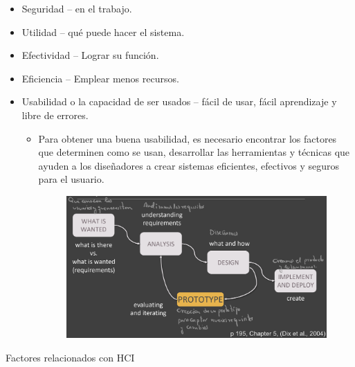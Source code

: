 \documentclass[12pt, twoside, openright]{report} %
\begin{document}
    \begin{itemize}
    
    \item
      Seguridad -- en el trabajo.
    \item
      Utilidad -- qué puede hacer el sistema.
    \item
      Efectividad -- Lograr su función.
    \item
      Eficiencia -- Emplear menos recursos.
    \item
      Usabilidad o la capacidad de ser usados -- fácil de usar, fácil
      aprendizaje y libre de errores.

      \begin{itemize}
      
      \item
        Para obtener una buena usabilidad, es necesario encontrar los
        factores que determinen como se usan, desarrollar las
        herramientas y técnicas que ayuden a los diseñadores a crear
        sistemas eficientes, efectivos y seguros para el usuario.

		\begin{figure}[H]
			{\includegraphics[scale=.17]{Untitled 3.png}}
		\end{figure}
       
      \end{itemize}
    \end{itemize}
\pagebreak
	Factores relacionados con HCI
\end{document}
